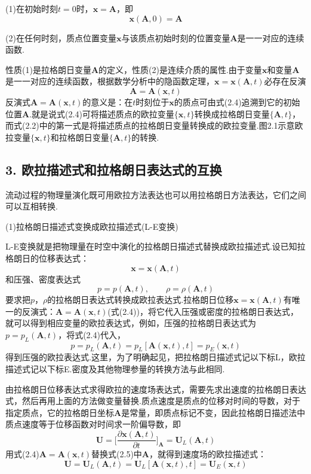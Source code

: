 (1)在初始时刻$t=0$时，$\boldsymbol{x}=\boldsymbol{A}$，即
\begin{equation*}
\boldsymbol{x}(\boldsymbol{A},0)=\boldsymbol{A}
\tag{2.3}
\end{equation*}

(2)在任何时刻，质点位置变量$\boldsymbol{x}$与该质点初始时刻的位置变量$\boldsymbol{A}$是一一对应的连续函数.

性质(1)是拉格朗日变量$\boldsymbol{A}$的定义，性质(2)是连续介质的属性.由于变量$\boldsymbol{x}$和变量$\boldsymbol{A}$是一一对应的连续函数，根据数学分析中的隐函数定理，$\boldsymbol{x}=\boldsymbol{x}(\boldsymbol{A},t)$必存在反演
\begin{equation*}
\boldsymbol{A}=\boldsymbol{A}(\boldsymbol{x},t)
\tag{2.4}
\end{equation*}
反演式$\boldsymbol{A}=\boldsymbol{A}(\boldsymbol{x},t)$的意义是：在$t$时刻位于$\boldsymbol{x}$的质点可由式(2.4)追溯到它的初始位置$\boldsymbol{A}$.就是说式(2.4)可将描述质点的欧拉变量$\{\boldsymbol{x},t\}$转换成拉格朗日变量$\{\boldsymbol{A},t\}$，而式(2.2)中的第一式是将描述质点的拉格朗日变量转换成的欧拉变量.图2.1示意欧拉变量$\{\boldsymbol{x},t\}$和拉格朗日变量$\{\boldsymbol{A},t\}$的转换.

\subsection*{3. 欧拉描述式和拉格朗日表达式的互换}

流动过程的物理量演化既可用欧拉方法表达也可以用拉格朗日方法表达，它们之间可以互相转换.

(1)拉格朗日描述式变换成欧拉描述式(L-E变换)

L-E变换就是把物理量在时空中演化的拉格朗日描述式替换成欧拉描述式.设已知拉格朗日的位移表达式：
\[
\boldsymbol{x}=\boldsymbol{x}(\boldsymbol{A},t)
\]
和压强、密度表达式
\[
p=p(\boldsymbol{A},t),\qquad \rho=\rho(\boldsymbol{A},t)
\]
要求把$p$，$\rho$的拉格朗日表达式转换成欧拉表达式.拉格朗日位移$\boldsymbol{x}=\boldsymbol{x}(\boldsymbol{A},t)$有唯一的反演式：$\boldsymbol{A}=\boldsymbol{A}(\boldsymbol{x},t)$(式(2.4))，将它代入压强或密度的拉格朗日表达式，就可以得到相应变量的欧拉表达式，例如，压强的拉格朗日表达式为$p=p_L(\boldsymbol{A},t)$，将式(2.4)代入，
\[
p=p_L(\boldsymbol{A},t)=p_L[\boldsymbol{A}(\boldsymbol{x},t),t]=p_E(\boldsymbol{x},t)
\]
得到压强的欧拉表达式.这里，为了明确起见，把拉格朗日描述式记以下标L，欧拉描述式记以下标E.密度及其他物理参量的转换方法与此相同.

由拉格朗日位移表达式求得欧拉的速度场表达式，需要先求出速度的拉格朗日表达式，然后再用上面的方法做变量替换.质点速度是质点的位移对时间的导数，对于指定质点，它的拉格朗日坐标$\boldsymbol{A}$是常量，即质点标记不变，因此拉格朗日描述法中质点速度等于位移函数对时间求一阶偏导数，即
\begin{equation*}
\boldsymbol{U}=\Big[\frac{\partial\boldsymbol{x}(\boldsymbol{A},t)}{\partial t}\Big]_{\boldsymbol{A}}=\boldsymbol{U}_L(\boldsymbol{A},t)
\tag{2.5}
\end{equation*}
用式(2.4)$\boldsymbol{A}=\boldsymbol{A}(\boldsymbol{x},t)$替换式(2.5)中$\boldsymbol{A}$，就得到速度场的欧拉描述式：
\[
\boldsymbol{U}=\boldsymbol{U}_L(\boldsymbol{A},t)=\boldsymbol{U}_L[\boldsymbol{A}(\boldsymbol{x},t),t]=\boldsymbol{U}_E(\boldsymbol{x},t)
\]

